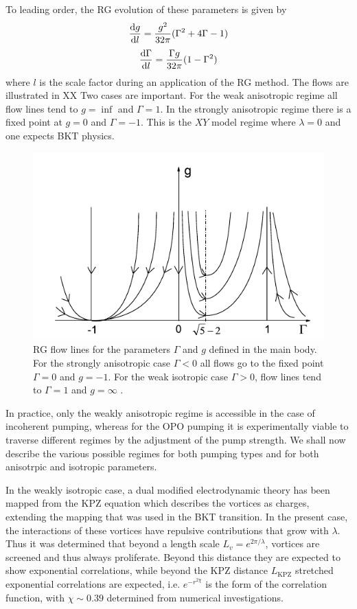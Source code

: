 To leading order, the RG evolution of these parameters is given by 
\[
\dv{g}{l} = \frac{g^2}{32\pi}(\Gamma^2 + 4\Gamma-1)
\]
\[
\dv{\Gamma}{l} = \frac{\Gamma g}{32 \pi}(1-\Gamma^2)
\]
where $l$ is the scale factor during an application of the RG method. The flows are illustrated in XX  Two cases are important. For the weak anisotropic regime all flow lines tend to $g=\inf$ and $\Gamma=1$. In the strongly anisotropic regime there is a fixed point at $g=0$ and $\Gamma=-1$. This is the $XY$ model regime where $\lambda=0$ and one expects BKT physics. 

\begin{figure}[htbp!]
	\centering
	\includegraphics[scale=0.8]{rgflows.pdf}
	\caption{RG flow lines for the parameters $\Gamma$ and $g$ defined in the main body. 
	For the strongly anisotropic case $\Gamma < 0$ all flows go to the fixed point $\Gamma =0$ and $g=-1$. 
	For the weak isotropic case $\Gamma >0$, flow lines tend to $\Gamma =1$ and $g = \infty$ \cite{PhysRevLett.111.088701}. }
	\label{fig:rgflows}

\end{figure}

In practice, only the weakly anisotropic regime is accessible in the case of incoherent pumping, whereas for the OPO pumping it is experimentally viable to traverse different regimes by the adjustment of the pump strength. We shall now describe the various possible regimes for both pumping types and for both anisotrpic and isotropic parameters. 

In the weakly isotropic case, a dual modified electrodynamic theory has been mapped from the KPZ equation which describes the vortices as charges, extending the mapping that was used in the BKT transition. In the present case, the interactions of these vortices have repulsive contributions that grow with $\lambda$. Thus it was determined that beyond a length scale $L_v = e^{2\pi/\lambda}$, vortices are screened and thus always proliferate. Beyond this distance they are expected to show exponential correlations, while beyond the KPZ distance $L_{\text{KPZ}}$ stretched exponential correlations are expected, i.e. $e^{-r^{2\chi}}$ is the form of the correlation function, with $\chi \sim 0.39$ determined from numerical investigations.

